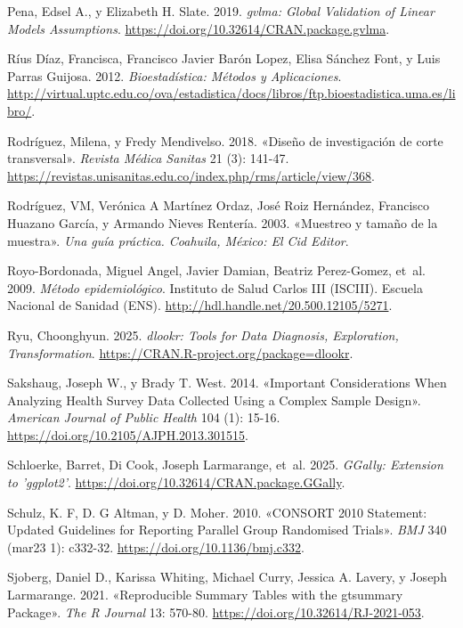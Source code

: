 \documentclass[
  spanish,
  a4paper,
]{scrbook}
\newlength{\cslhangindent}
\newenvironment{CSLReferences}[2] %
 {\begin{list}{}{%
  \setlength{\itemindent}{0pt}
  \setlength{\leftmargin}{0pt}
  \setlength{\parsep}{0pt}
  \ifodd #1
   \setlength{\leftmargin}{\cslhangindent}
   \setlength{\itemindent}{-1\cslhangindent}
  \fi
  \setlength{\itemsep}{#2\baselineskip}}}
 {\end{list}}
\begin{document}
\begin{CSLReferences}{1}{1}
Pena, Edsel A., y Elizabeth H. Slate. 2019. \emph{gvlma: Global
Validation of Linear Models Assumptions}.
\url{https://doi.org/10.32614/CRAN.package.gvlma}.

Ríus Díaz, Francisca, Francisco Javier Barón Lopez, Elisa Sánchez Font,
y Luis Parras Guijosa. 2012. \emph{Bioestadística: {Métodos} y
{Aplicaciones}}.
\url{http://virtual.uptc.edu.co/ova/estadistica/docs/libros/ftp.bioestadistica.uma.es/libro/}.

Rodríguez, Milena, y Fredy Mendivelso. 2018. {«Diseño de investigación
de corte transversal»}. \emph{Revista Médica Sanitas} 21 (3): 141-47.
\url{https://revistas.unisanitas.edu.co/index.php/rms/article/view/368}.

Rodríguez, VM, Verónica A Martínez Ordaz, José Roiz Hernández, Francisco
Huazano García, y Armando Nieves Rentería. 2003. {«Muestreo y tamaño de
la muestra»}. \emph{Una guía práctica. Coahuila, México: El Cid Editor}.

Royo-Bordonada, Miguel Angel, Javier Damian, Beatriz Perez-Gomez, et~al.
2009. \emph{Método epidemiológico}. Instituto de Salud Carlos III
(ISCIII). Escuela Nacional de Sanidad (ENS).
\url{http://hdl.handle.net/20.500.12105/5271}.

Ryu, Choonghyun. 2025. \emph{{dlookr}: Tools for Data Diagnosis,
Exploration, Transformation}.
\url{https://CRAN.R-project.org/package=dlookr}.

Sakshaug, Joseph W., y Brady T. West. 2014. {«Important {Considerations}
{When} {Analyzing} {Health} {Survey} {Data} {Collected} {Using} a
{Complex} {Sample} {Design}»}. \emph{American Journal of Public Health}
104 (1): 15-16. \url{https://doi.org/10.2105/AJPH.2013.301515}.

Schloerke, Barret, Di Cook, Joseph Larmarange, et~al. 2025.
\emph{GGally: Extension to 'ggplot2'}.
\url{https://doi.org/10.32614/CRAN.package.GGally}.

Schulz, K. F, D. G Altman, y D. Moher. 2010. {«CONSORT 2010 Statement:
Updated Guidelines for Reporting Parallel Group Randomised Trials»}.
\emph{BMJ} 340 (mar23 1): c332-32.
\url{https://doi.org/10.1136/bmj.c332}.

Sjoberg, Daniel D., Karissa Whiting, Michael Curry, Jessica A. Lavery, y
Joseph Larmarange. 2021. {«Reproducible Summary Tables with the
gtsummary Package»}. \emph{{The R Journal}} 13: 570-80.
\url{https://doi.org/10.32614/RJ-2021-053}.


\end{CSLReferences}
\end{document}
